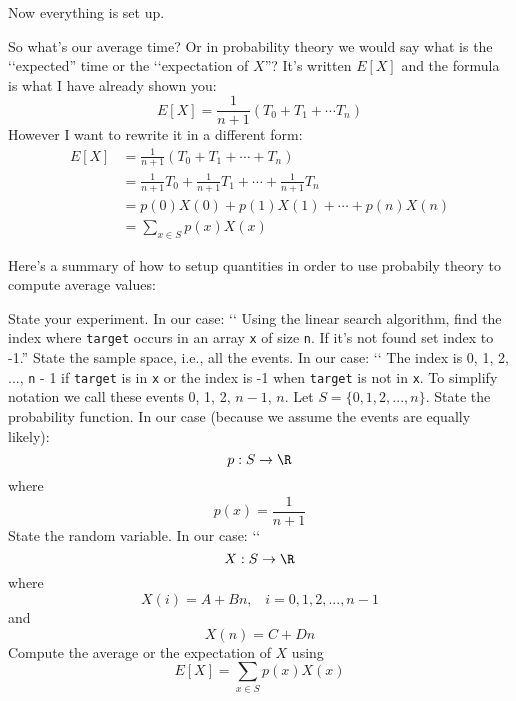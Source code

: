 Now everything is set up.

So what's our average time? Or in probability theory we would say
what is the \lq\lq expected'' time or 
the \lq\lq expectation of $X$''?
It's written $E[X]$ and the formula is what I have already shown you:
\[
E[X] = \frac{1}{n + 1} (T_0 + T_1 + \cdots T_n)
\]
However I want to rewrite it in a different form:
\begin{align*}
E[X] 
&= \frac{1}{n + 1} (T_0 + T_1 + \cdots + T_n) \\
&= \frac{1}{n + 1} T_0 + \frac{1}{n+1}T_1 + \cdots + \frac{1}{n + 1}T_n \\
&= p(0) X(0) + p(1) X(1) + \cdots + p(n) X(n) \\
&= \sum_{x \in S} p(x) X(x)
\end{align*}

Here's a summary of how to setup quantities in order to use probabily
theory to compute average values:
\begin{itemize}
\li State your experiment. In our case: \lq\lq
Using the linear search algorithm, 
find the index where \verb!target! occurs in an array \verb!x!
of size \verb!n!. If it's not found set index to -1.''
\li State the sample space, i.e., all the events.
In our case: 
\lq\lq
The index is 0, 1, 2, ..., \verb!n! - 1 if \verb!target!
is in \verb!x! or the index is -1 when \verb!target! is not in \verb!x!.
To simplify notation we call these events 0, 1, 2, $n-1$, $n$.
Let $S = \{0, 1, 2, ..., n\}$.
\li State the probability function.
In our case (because we assume the events are equally likely):
\[
p: S \rightarrow \R
\]
where 
\[
p(x) = \frac{1}{n + 1}
\]
\li State the random variable.
In our case: \lq\lq
\[
X : S \rightarrow \R
\]
where
\[
X(i) = A + Bn, \,\,\,\,\, i = 0, 1, 2, ..., n - 1
\]
and 
\[
X(n) = C + Dn
\]
\li Compute the average or the expectation of $X$ using
\[
E[X] = \sum_{x \in S} p(x) X(x)
\]
\end{itemize}
